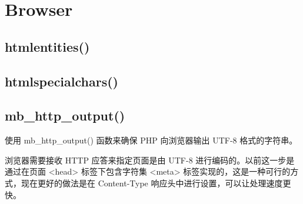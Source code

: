 \section{Browser}



\subsection{htmlentities()}


\subsection{htmlspecialchars()}

\subsection{mb\_http\_output()}


使用 mb\_http\_output() 函数来确保 PHP 向浏览器输出 UTF-8 格式的字符串。

浏览器需要接收 HTTP 应答来指定页面是由 UTF-8 进行编码的。以前这一步是通过在页面 <head> 标签下包含字符集 <meta> 标签实现的，这是一种可行的方式，现在更好的做法是在 Content-Type 响应头中进行设置，可以让处理速度更快。


